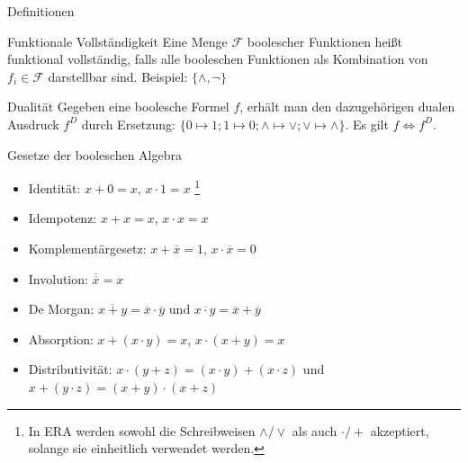 \documentclass[
  german,            %
  aspectratio=169,    %
]{tumbeamer}
\begin{document}
\begin{frame}[c, fragile]{Definitionen}{}
 \begin{block}{Funktionale Vollständigkeit}
      Eine Menge $\mathcal{F}$ boolescher Funktionen heißt funktional vollständig, falls alle booleschen Funktionen als Kombination von $f_i\in\mathcal{F}$ darstellbar sind. Beispiel: $\{\wedge, \neg\}$
 \end{block}
 \vfill
 \begin{block}{Dualität}
  Gegeben eine boolesche Formel $f$, erhält man den dazugehörigen dualen Ausdruck $f^D$ durch Ersetzung: $\{0\mapsto 1; 1\mapsto 0; \wedge\mapsto\vee; \vee\mapsto\wedge\}$. Es gilt $f \Leftrightarrow f^D$.\footnotemark
\end{block}
\end{frame}

\begin{frame}[c, fragile]{Gesetze der booleschen Algebra}{}
  \begin{itemize}
    \item Identität: $x+0=x$, $x\cdot 1=x$ \footnote[1]{In ERA werden sowohl die Schreibweisen $\wedge/\vee$ als auch $\cdot / +$ akzeptiert, solange sie einheitlich verwendet werden.}
    \item Idempotenz: $x+x=x$, $x\cdot x=x$
    \item Komplementärgesetz: $x+\overline{x}=1$, $x\cdot\overline{x}=0$
    \item Involution: $\overline{\overline{x}}=x$
    \item De Morgan: $\overline{x+y}=\overline{x}\cdot\overline{y}$ und $\overline{x\cdot y}=\overline{x}+\overline{y}$
    \item Absorption: $x+(x\cdot y)=x$, $x\cdot(x+y)=x$
    \item Distributivität: $x\cdot(y+z)=(x\cdot y)+ (x\cdot z)$ und $x+(y\cdot z)=(x+y)\cdot (x+z)$
  \end{itemize}
\end{frame}
\end{document}
